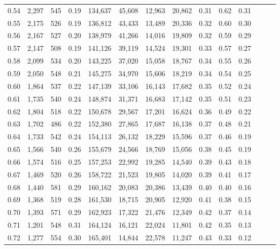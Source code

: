 \begin{tabular}{rrrrrrrrrrrrrr}
0.54 &  2,297 &  545 &  0.19 &  134,637 &   45,608 &  12,963 &  20,862 &  0.31 &  0.62 &      0.31 \\
0.55 &  2,175 &  526 &  0.19 &  136,812 &   43,433 &  13,489 &  20,336 &  0.32 &  0.60 &      0.30 \\
0.56 &  2,167 &  527 &  0.20 &  138,979 &   41,266 &  14,016 &  19,809 &  0.32 &  0.59 &      0.29 \\
0.57 &  2,147 &  508 &  0.19 &  141,126 &   39,119 &  14,524 &  19,301 &  0.33 &  0.57 &      0.27 \\
0.58 &  2,099 &  534 &  0.20 &  143,225 &   37,020 &  15,058 &  18,767 &  0.34 &  0.55 &      0.26 \\
0.59 &  2,050 &  548 &  0.21 &  145,275 &   34,970 &  15,606 &  18,219 &  0.34 &  0.54 &      0.25 \\
0.60 &  1,864 &  537 &  0.22 &  147,139 &   33,106 &  16,143 &  17,682 &  0.35 &  0.52 &      0.24 \\
0.61 &  1,735 &  540 &  0.24 &  148,874 &   31,371 &  16,683 &  17,142 &  0.35 &  0.51 &      0.23 \\
0.62 &  1,804 &  518 &  0.22 &  150,678 &   29,567 &  17,201 &  16,624 &  0.36 &  0.49 &      0.22 \\
0.63 &  1,702 &  486 &  0.22 &  152,380 &   27,865 &  17,687 &  16,138 &  0.37 &  0.48 &      0.21 \\
0.64 &  1,733 &  542 &  0.24 &  154,113 &   26,132 &  18,229 &  15,596 &  0.37 &  0.46 &      0.19 \\
0.65 &  1,566 &  540 &  0.26 &  155,679 &   24,566 &  18,769 &  15,056 &  0.38 &  0.45 &      0.19 \\
0.66 &  1,574 &  516 &  0.25 &  157,253 &   22,992 &  19,285 &  14,540 &  0.39 &  0.43 &      0.18 \\
0.67 &  1,469 &  520 &  0.26 &  158,722 &   21,523 &  19,805 &  14,020 &  0.39 &  0.41 &      0.17 \\
0.68 &  1,440 &  581 &  0.29 &  160,162 &   20,083 &  20,386 &  13,439 &  0.40 &  0.40 &      0.16 \\
0.69 &  1,368 &  519 &  0.28 &  161,530 &   18,715 &  20,905 &  12,920 &  0.41 &  0.38 &      0.15 \\
0.70 &  1,393 &  571 &  0.29 &  162,923 &   17,322 &  21,476 &  12,349 &  0.42 &  0.37 &      0.14 \\
0.71 &  1,201 &  548 &  0.31 &  164,124 &   16,121 &  22,024 &  11,801 &  0.42 &  0.35 &      0.13 \\
0.72 &  1,277 &  554 &  0.30 &  165,401 &   14,844 &  22,578 &  11,247 &  0.43 &  0.33 &      0.12 \\

\end{tabular}
